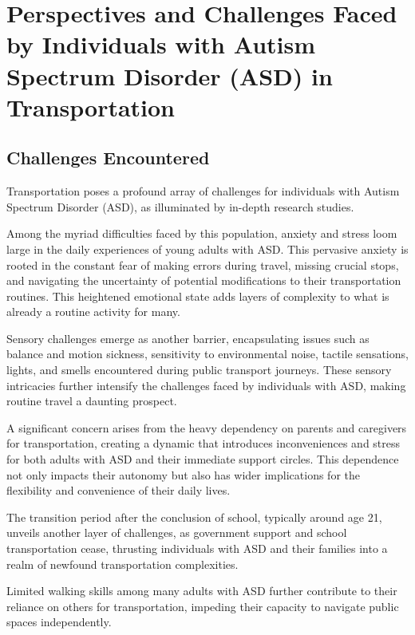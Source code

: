 \section{Perspectives and Challenges Faced by Individuals with Autism Spectrum Disorder (ASD) in Transportation}

\subsection{Challenges Encountered}

    Transportation poses a profound array of challenges for individuals with Autism Spectrum Disorder (ASD), as illuminated by in-depth research studies. 
    
    Among the myriad difficulties faced by this population, anxiety and stress loom large in the daily experiences of young adults with ASD. This pervasive anxiety is rooted in the constant fear of making errors during travel, missing crucial stops, and navigating the uncertainty of potential modifications to their transportation routines. This heightened emotional state adds layers of complexity to what is already a routine activity for many. 
    
    Sensory challenges emerge as another barrier, encapsulating issues such as balance and motion sickness, sensitivity to environmental noise, tactile sensations, lights, and smells encountered during public transport journeys. These sensory intricacies further intensify the challenges faced by individuals with ASD, making routine travel a daunting prospect. 
    
    A significant concern arises from the heavy dependency on parents and caregivers for transportation, creating a dynamic that introduces inconveniences and stress for both adults with ASD and their immediate support circles. This dependence not only impacts their autonomy but also has wider implications for the flexibility and convenience of their daily lives. 
    
    The transition period after the conclusion of school, typically around age 21, unveils another layer of challenges, as government support and school transportation cease, thrusting individuals with ASD and their families into a realm of newfound transportation complexities. 
    
    Limited walking skills among many adults with ASD further contribute to their reliance on others for transportation, impeding their capacity to navigate public spaces independently. 
    

